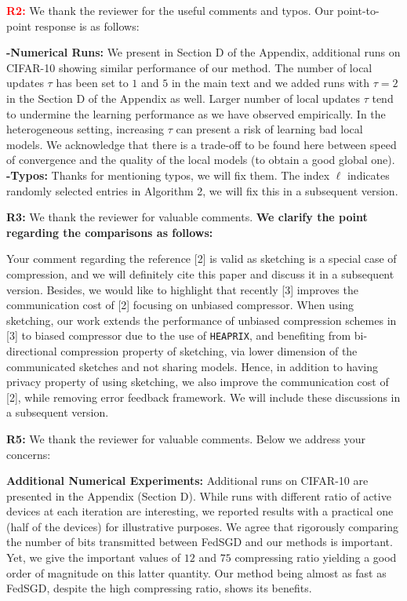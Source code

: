 \documentclass{article}
\begin{document}
\textbf{\textcolor{red}{R2:}} We thank the reviewer for the useful comments and typos. Our point-to-point response is as follows:\vspace{-5pt}

\textbf{-Numerical Runs:} We present in Section D of the Appendix, additional runs on CIFAR-10 showing similar performance of our method. The number of local updates $\tau$ has been set to $1$ and $5$ in the main text and we added runs with $\tau = 2$ in the Section D of the Appendix as well. Larger number of local updates $\tau$ tend to undermine the learning performance as we have observed empirically. In the heterogeneous setting, increasing $\tau$ can present a risk of learning bad local models. We acknowledge that there is a trade-off to be found here between speed of convergence and the quality of the local models (to obtain a good global one). \textbf{-Typos:} Thanks for mentioning typos, we will fix them. The index $\ell$ indicates randomly selected entries in Algorithm 2, we will fix this in a subsequent version.  


\textbf{\textcolor{yellow!50!black}{R3:}} We thank the reviewer for valuable comments. \textbf{We clarify the point regarding the comparisons as follows:}\vspace{-5pt}

 Your comment regarding the reference [2] is valid as sketching is a special case of compression, and we will definitely cite this paper and discuss it in a subsequent version. Besides, we would like to highlight that recently [3] improves the communication cost of [2] focusing on unbiased compressor. 
When using sketching, our work extends the performance of unbiased compression schemes in [3] to biased compressor \textcolor{red!50!black}{due to the use of \texttt{HEAPRIX}, and benefiting from bi-directional compression property of sketching, via lower dimension of the communicated sketches and not sharing models}.  
Hence, in addition to having privacy property of using sketching, we also improve the communication cost of [2], while \textcolor{red!50!black}{removing error feedback framework}. We will include these discussions in a subsequent version.    



\textbf{\textcolor{green!50!black}{R5:}} We thank the reviewer for valuable comments. Below we address your concerns:\vspace{-5pt}

\textbf{Additional Numerical Experiments:} Additional runs on CIFAR-10 are presented in the Appendix (Section D). While runs with different ratio of active devices at each iteration are interesting, we reported results with a practical one (half of the devices) for illustrative purposes.
We agree that rigorously comparing the number of bits transmitted between FedSGD and our methods is important.
Yet, we give the important values of $12$ and $75$ compressing ratio yielding a good order of magnitude on this latter quantity. 
Our method being almost as fast as FedSGD, despite the high compressing ratio, shows its benefits.
\end{document}
